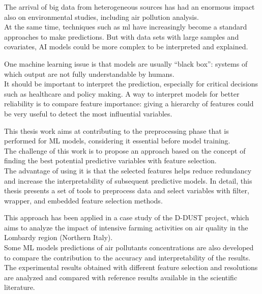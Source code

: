 The arrival of big data from heterogeneous sources has had an enormous impact also on environmental studies, including air pollution analysis.\\
At the same time, techniques such as \gls{ml} have increasingly become a standard approaches to make predictions. But with data sets with large samples and covariates, AI models could be more complex to be interpreted and explained.\par
One machine learning issue is that models are usually “black box”: systems of which output are not fully understandable by humans. \\
It should be important to interpret the prediction, especially for critical decisions such as healthcare and policy making.
A way to interpret models for better reliability is to compare feature importance: giving a hierarchy of features could be very useful to detect the most influential variables.\par
This thesis work aims at contributing to the preprocessing phase that is performed for ML models, considering it essential before model training.\\
The challenge of this work is to propose an approach based on the concept of finding the best potential predictive variables with feature selection.\\
The advantage of using it is that the selected features helps reduce redundancy and increase the interpretability of subsequent predictive models.
In detail, this thesis presents a set of tools to preprocess data and select variables with filter, wrapper, and embedded feature selection methods.\par
This approach has been applied in a case study of the D-DUST project, which aims to analyze the impact of intensive farming activities on air quality in the Lombardy region (Northern Italy).\\
Some ML models predictions of air pollutants concentrations are also developed to compare the contribution to the accuracy and interpretability of the results.\\
The experimental results obtained with different feature selection  and resolutions are analyzed and compared with reference results available in the scientific literature.
\\
\\